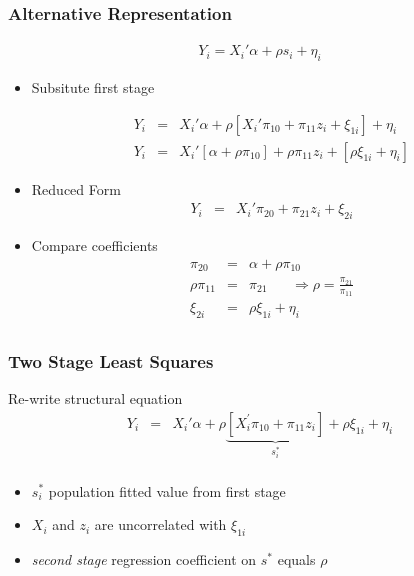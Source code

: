 \documentclass[pdftex]{beamer}
\begin{document}
\begin{frame}
\frametitle{Alternative Representation}


\[\begin{array}{cc}
   Y_{i} =  X_{i}' \alpha + \rho s_{i}+\eta_{i}

    \end{array}
\]

\begin{itemize}
\item Subsitute first stage

\begin{eqnarray*}
   Y_{i} &=& X_{i}' \alpha+ \rho\left[X_{i}'\pi_{10}+\pi_{11}z_{i}+ \xi_{1i}\right]+\eta_{i}\\
   Y_{i} &=&  X_{i}'\left[\alpha+ \rho \pi_{10}\right]+\rho \pi_{11}z_{i}+\left[\rho \xi_{1i}+\eta_{i}\right]
\end{eqnarray*}
   \item Reduced Form
\begin{eqnarray*}
   Y_{i}   &=&  X_{i}'\pi_{20}+\pi_{21}z_{i}+ \xi_{2i}
\end{eqnarray*}
\item Compare coefficients
 \begin{eqnarray*}
   \pi_{20}&=& \alpha+ \rho\pi_{10}\\
   \rho\pi_{11}&=& \pi_{21} \;\;\;\;\;\; \Rightarrow \rho=\frac{\pi_{21}}{\pi_{11}}\\
   \xi_{2i}&=& \rho\xi_{1i} + \eta_{i}\\
\end{eqnarray*}



\end{itemize}
\end{frame}



\begin{frame}
\frametitle{Two Stage Least Squares}

Re-write structural equation
\begin{eqnarray*}
 Y_{i} &=& X_{i}' \alpha+ \rho\underbrace{\left[X_{i}^{'}\pi_{10}+\pi_{11}z_{i}\right]}_{s^*_i}+\rho\xi_{1i}+\eta_{i} \\
\end{eqnarray*}

\begin{itemize}
\item $s^*_i$ population fitted value  from first stage
\item $X_{i}$ and $z_{i}$ are uncorrelated with $\xi_{1i}$
\item \emph{second stage} regression coefficient on $s^{*}$ equals $\rho$

\end {itemize}
\end{frame}
\end{document}
